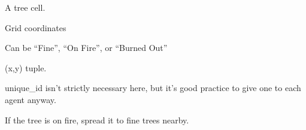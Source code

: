 \documentclass[letterpaper,10pt,english]{sphinxmanual}
\begin{document}
\begin{fulllineitems}
\label{\detokenize{index:examples.forest_fire.forest_fire.agent.TreeCell}}
A tree cell.


\begin{fulllineitems}
Grid coordinates

\end{fulllineitems}


\begin{fulllineitems}
\label{\detokenize{index:examples.forest_fire.forest_fire.agent.TreeCell.condition}}
Can be “Fine”, “On Fire”, or “Burned Out”

\end{fulllineitems}


\begin{fulllineitems}
\label{\detokenize{index:examples.forest_fire.forest_fire.agent.TreeCell.unique_id}}
(x,y) tuple.

\end{fulllineitems}


unique\_id isn’t strictly necessary here, but it’s good
practice to give one to each agent anyway.

\begin{fulllineitems}
\label{\detokenize{index:examples.forest_fire.forest_fire.agent.TreeCell.step}}
If the tree is on fire, spread it to fine trees nearby.

\end{fulllineitems}


\end{fulllineitems}
\end{document}
